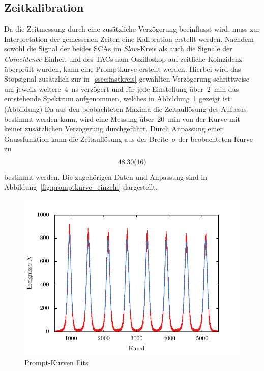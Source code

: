 \documentclass[11pt, a4paper]{article}
\numberwithin{equation}{section}
\newcommand{\korr}[1]{{\color{red}(#1)}}
\begin{document}
\subsection{Zeitkalibration}
Da die Zeitmessung durch eine zusätzliche Verzögerung beeinflusst wird, muss zur Interpretation der gemessenen Zeiten eine Kalibration erstellt werden.
Nachdem sowohl die Signal der beides SCAs im \textit{Slow}-Kreis als auch die Signale der \textit{Coincidence}-Einheit und des TACs aam Oszilloskop auf zeitliche Koinzidenz überprüft wurden, kann eine Promptkurve erstellt werden.
Hierbei wird das Stopsignal zusätzlich zur in~\ref{ssec:fastkreis} gewählten Verzögerung schrittweise um jeweils weitere~\SI{4}{ns} verzögert und für jede Einstellung über~\SI{2}{min} das entstehende Spektrum aufgenommen, welches in Abbildung~\ref{fig:promptkurven} gezeigt ist.
\korr{Abbildung}
Da aus den beobachteten Maxima die Zeitauflösung des Aufbaus bestimmt werden kann, wird eine Messung über~\SI{20}{min} von der Kurve mit keiner zusätzlichen Verzögerung durchgeführt.
Durch Anpassung einer Gaussfunktion kann die Zeitauflösung aus der Breite~$\sigma$ der beobachteten Kurve zu 
\begin{align*}
\num{48.30+-0.16}
\end{align*}
bestimmt werden.
Die zugehörigen Daten und Anpassung sind in Abbildung~\ref{fig:promptkurve_einzeln} dargestellt.

\begin{figure}[h]
	\centering
	\includegraphics{./figures/prompt_curve_fits.pdf}
	\caption{Prompt-Kurven Fits}
	\label{fig:promptkurven}
\end{figure}
\end{document}
